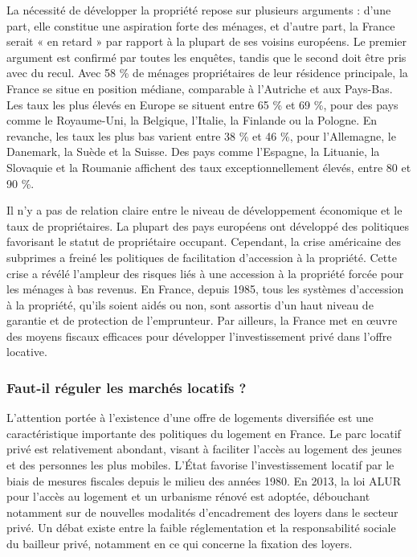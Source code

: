 \documentclass[a4paper, 12pt]{report}
\begin{document}
La nécessité de développer la propriété repose sur plusieurs arguments : d'une part, elle constitue une aspiration forte des ménages, et d'autre part, la France serait « en retard » par rapport à la plupart de ses voisins européens. Le premier argument est confirmé par toutes les enquêtes, tandis que le second doit être pris avec du recul. Avec 58 \% de ménages propriétaires de leur résidence principale, la France se situe en position médiane, comparable à l’Autriche et aux Pays-Bas. Les taux les plus élevés en Europe se situent entre 65 \% et 69 \%, pour des pays comme le Royaume-Uni, la Belgique, l’Italie, la Finlande ou la Pologne. En revanche, les taux les plus bas varient entre 38 \% et 46 \%, pour l’Allemagne, le Danemark, la Suède et la Suisse. Des pays comme l’Espagne, la Lituanie, la Slovaquie et la Roumanie affichent des taux exceptionnellement élevés, entre 80 et 90 \%.

Il n’y a pas de relation claire entre le niveau de développement économique et le taux de propriétaires. La plupart des pays européens ont développé des politiques favorisant le statut de propriétaire occupant. Cependant, la crise américaine des subprimes a freiné les politiques de facilitation d’accession à la propriété. Cette crise a révélé l’ampleur des risques liés à une accession à la propriété forcée pour les ménages à bas revenus. En France, depuis 1985, tous les systèmes d’accession à la propriété, qu'ils soient aidés ou non, sont assortis d’un haut niveau de garantie et de protection de l’emprunteur. Par ailleurs, la France met en œuvre des moyens fiscaux efficaces pour développer l’investissement privé dans l’offre locative.

\subsubsection{Faut-il réguler les marchés locatifs ?}

L’attention portée à l’existence d’une offre de logements diversifiée est une caractéristique importante des politiques du logement en France. Le parc locatif privé est relativement abondant, visant à faciliter l’accès au logement des jeunes et des personnes les plus mobiles. L’État favorise l’investissement locatif par le biais de mesures fiscales depuis le milieu des années 1980. En 2013, la loi ALUR pour l’accès au logement et un urbanisme rénové est adoptée, débouchant notamment sur de nouvelles modalités d’encadrement des loyers dans le secteur privé. Un débat existe entre la faible réglementation et la responsabilité sociale du bailleur privé, notamment en ce qui concerne la fixation des loyers.
\end{document}
